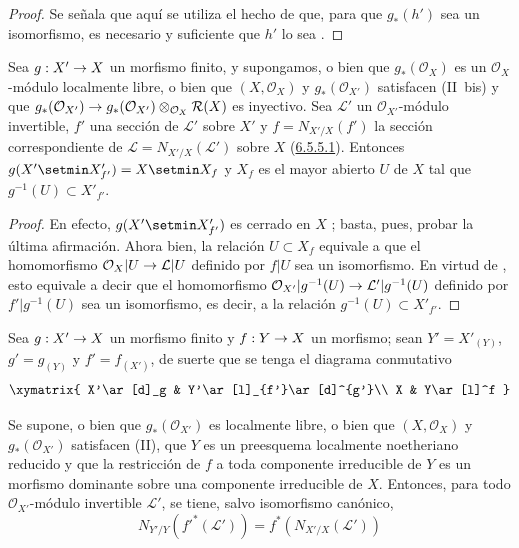 \documentclass[oneside,10pt]{amsart}
\makeatletter
\newcommand{\ega@arrow}[2]{\mathchoice{#1}{#2}{#2}{#2}}
\renewcommand{\to}{\ega@arrow{\longrightarrow}{\rightarrow}}
\newcommand{\oldpage}[2][]{\marginnote{\normalfont\footnotesize\textbf{#1}~|~#2}\ignorespaces}
\let\EGAOriginalLabel\label
\renewcommand{\label}[1]{\phantomsection\EGAOriginalLabel{#1}}
\makeatother
\begin{document}
\begin{proof}
Se señala que aquí se utiliza el hecho de que, para que $g_*(h')$ sea un isomorfismo, es necesario y suficiente que $h'$ lo sea .
\end{proof}

\begin{corollary}[6.5.7]
\label{II.6.5.7-fr}
Sea $g:X'\to X$ un morfismo finito, y supongamos, o bien que $g_*(\mathcal{O}_X)$ es un $\mathcal{O}_X$-módulo localmente libre, o bien que $(X,\mathcal{O}_X)$ y $g_*(\mathcal{O}_{X'})$ satisfacen \textup{(II~bis)} y que
$g_*(\mathcal{O}_{X'})\to
g_*(\mathcal{O}_{X'})\otimes_{\mathcal{O}_X}\mathcal{R}(X)$
es inyectivo.
Sea $\mathcal{L}'$ un $\mathcal{O}_{X'}$-módulo invertible, $f'$ una sección de $\mathcal{L}'$ sobre $X'$ y $f=N_{X'/X}(f')$ la sección correspondiente de $\mathcal{L}=N_{X'/X}(\mathcal{L}')$ sobre $X$ \textup{(\hyperref[II.6.5.5.1-fr]{6.5.5.1})}.
\oldpage[II]{130}
Entonces
$g(X'\setmin X'_{f'})=X\setmin X_f$
y $X_f$ es el mayor abierto $U$ de $X$ tal que $g^{-1}(U)\subset X'_{f'}$.
\end{corollary}

\begin{proof}
En efecto, $g(X'\setmin X'_{f'})$ es cerrado en $X$ ;
basta, pues, probar la última afirmación.
Ahora bien, la relación $U\subset X_f$ equivale a que el homomorfismo $\mathcal{O}_X|U\to\mathcal{L}|U$ definido por $f|U$ sea un isomorfismo.
En virtud de , esto equivale a decir que el homomorfismo
$\mathcal{O}_{X'}|g^{-1}(U)\to\mathcal{L}'|g^{-1}(U)$
definido por $f'|g^{-1}(U)$ sea un isomorfismo, es decir, a la relación $g^{-1}(U)\subset X'_{f'}$.
\end{proof}


\begin{proposition}[6.5.8]
\label{II.6.5.8-fr}
Sea $g:X'\to X$ un morfismo finito y $f:Y\to X$ un morfismo;
sean $Y'=X'_{(Y)}$, $g'=g_{(Y)}$ y $f'=f_{(X')}$, de suerte que se tenga el diagrama conmutativo
\[
\xymatrix{
X'\ar[d]_g & Y'\ar[l]_{f'}\ar[d]^{g'}\\
X & Y\ar[l]^f
}
\]

Se supone, o bien que $g_*(\mathcal{O}_{X'})$ es localmente libre, o bien que $(X,\mathcal{O}_X)$ y $g_*(\mathcal{O}_{X'})$ satisfacen \textup{(II)}, que $Y$ es un preesquema localmente noetheriano reducido y que la restricción de $f$ a toda componente irreducible de $Y$ es un morfismo dominante sobre una componente irreducible de $X$.
Entonces, para todo $\mathcal{O}_{X'}$-módulo invertible $\mathcal{L}'$, se tiene, salvo isomorfismo canónico,
\[
N_{Y'/Y}({f'}^*(\mathcal{L}'))=f^*(N_{X'/X}(\mathcal{L}'))
\]
\end{proposition}
\end{document}
